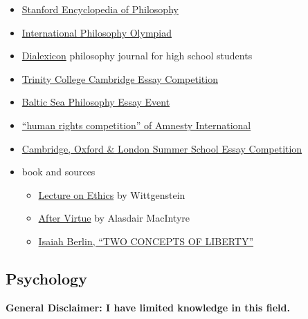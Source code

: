 \documentclass{article}
\begin{document}
\begin{itemize}
    \item \href{https://plato.stanford.edu/}{Stanford Encyclopedia of Philosophy}
    \item \href{https://www.philosophy-olympiad.org/}{International Philosophy Olympiad}
    \item \href{https://www.dialexicon.org/}{Dialexicon} philosophy journal for high school students
    \item \href{https://www.trin.cam.ac.uk/undergraduate/essay-prizes/}{Trinity College Cambridge Essay Competition}
    \item \href{https://bspee.wordpress.com/}{Baltic Sea Philosophy Essay Event}
    \item \href{https://www.amnesty.org.uk/use-your-voice}{``human rights competition'' of Amnesty International}
    \item \href{https://www.immerse.education/essay-competition/}{Cambridge, Oxford \& London Summer School Essay Competition}
    \item book and sources
    \begin{itemize}
        \item \href{https://www.goodreads.com/da/book/show/17563346-lecture-on-ethics}{Lecture on Ethics} by Wittgenstein
        \item \href{https://www.goodreads.com/book/show/332138.After_Virtue}{After Virtue} by  Alasdair MacIntyre
        \item \href{https://cactus.dixie.edu/green/B_Readings/I_Berlin\%20Two\%20Concpets\%20of\%20Liberty.pdf}{Isaiah Berlin, ``TWO CONCEPTS OF LIBERTY''}
    \end{itemize}
\end{itemize}

\subsection{Psychology}
\textbf{General Disclaimer: I have limited knowledge in this field.}
\end{document}
